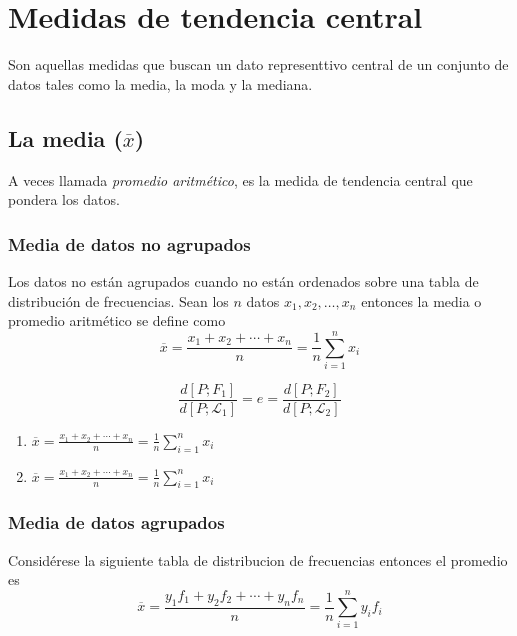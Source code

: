 \documentclass[
  10pt,
]{krantz}
\providecommand{\tightlist}{%
  \setlength{\itemsep}{0pt}\setlength{\parskip}{0pt}}
\theoremstyle{definition}
\theoremstyle{definition}
\theoremstyle{definition}
\theoremstyle{definition}
\theoremstyle{remark}
\begin{document}
\hypertarget{medidas-de-tendencia-central}{%
\chapter{Medidas de tendencia central}\label{medidas-de-tendencia-central}}

Son aquellas medidas que buscan un dato representtivo central de un conjunto de datos tales como la media, la moda y la mediana.

\hypertarget{la-media-overlinex}{%
\section{\texorpdfstring{La media (\(\overline{x}\))}{La media (\textbackslash overline\{x\})}}\label{la-media-overlinex}}

A veces llamada \emph{promedio aritmético}, es la medida de tendencia central que pondera los datos.

\hypertarget{media-de-datos-no-agrupados}{%
\subsection{Media de datos no agrupados}\label{media-de-datos-no-agrupados}}

Los datos no están agrupados cuando no están ordenados sobre una tabla de distribución de frecuencias. Sean los \(n\) datos \(x_1, x_2, \ldots, x_n\) entonces la media o promedio aritmético se define como
\[ \label{eq:w1} 
\overline{x}=\frac{x_1+x_2+\cdots+x_n}{n}=\frac{1}{n}\sum_{i=1}^nx_i 
\]

\[ 
\label{eq:ww}
\frac{d\left[P; F_1\right]}{d\left[P; \mathcal{L}_1\right]}=e=\frac{d\left[P; F_2\right]}{d\left[P; \mathcal{L}_2\right]}
\]

\begin{enumerate}
\def\labelenumi{\arabic{enumi}.}
\tightlist
\item
  \(\overline{x}=\frac{x_1+x_2+\cdots+x_n}{n}=\frac{1}{n}\sum_{i=1}^nx_i\)
\item
  \(\overline{x}=\frac{x_1+x_2+\cdots+x_n}{n}=\frac{1}{n}\sum_{i=1}^nx_i\)
\end{enumerate}

\hypertarget{media-de-datos-agrupados}{%
\subsection{Media de datos agrupados}\label{media-de-datos-agrupados}}

Considérese la siguiente tabla de distribucion de frecuencias entonces el promedio es \[\overline{x}=\frac{y_1f_1+y_2f_2+\cdots+y_nf_n}{n}=\frac{1}{n}\sum_{i=1}^ny_if_i\]
\end{document}
